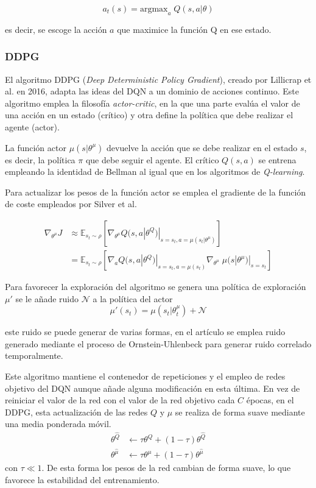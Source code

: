 \begin{equation}		
		a_t(s) = \text{argmax}_a\;Q(s,a|\theta) 
\end{equation}

es decir, se escoge la acción $a$ que maximice la función Q en ese estado.
\subsubsection{DDPG}

El algoritmo DDPG (\textit{Deep Deterministic Policy Gradient}), creado por Lillicrap et al. \cite{lillicrap2015continuous} en 2016, adapta las ideas del DQN a un dominio de acciones continuo. Este algoritmo emplea la filosofía \textit{actor-critic}, en la que una parte evalúa el valor de una acción en un estado (crítico) y  otra define la política que debe realizar el agente (actor).

La función actor $\mu(s|\theta^\mu)$ devuelve la acción que se debe realizar en el estado $s$, es decir, la política $\pi$ que debe seguir el agente. El crítico $Q(s,a)$ se entrena empleando la identidad de Bellman al igual que en los algoritmos de \textit{Q-learning}.

Para actualizar los pesos de la función actor se emplea el gradiente de la función de coste empleados por Silver et al. \cite{silver2014deterministic}

	\begin{align}
		\nabla_{\theta^\mu}J &\approx \mathbb{E}_{s_t \sim \rho}\left[ \nabla_{\theta^\mu} Q(s,a |\theta^Q)|_{s=s_t,a=\mu(s_t|\theta^\mu)}\right]\\
		&=  \mathbb{E}_{s_t \sim \rho}\left[ \nabla_{a} Q(s,a |\theta^Q)|_{s=s_t,a=\mu(s_t)} \nabla_{\theta^\mu}\; \mu(s|\theta^\mu)|_{s=s_t}    \right]\nonumber 
	\end{align}

Para favorecer la exploración del algoritmo se genera una política de exploración $\mu'$ se le añade ruido $\mathcal{N}$ a la política del actor
	\begin{equation}
		 \mu'(s_t)=\mu(s_t|\theta^\mu_t) + \mathcal{N}
	\end{equation}

este ruido se puede generar de varias formas, en el artículo se emplea ruido generado mediante el proceso de Ornstein-Uhlenbeck \cite{uhlenbeck1930theory} para generar ruido correlado temporalmente.

Este algoritmo mantiene el contenedor de repeticiones y el empleo de redes objetivo del DQN aunque añade alguna modificación en esta última. En vez de reiniciar el valor de la red  con el valor de la red objetivo cada $C$ épocas, en el DDPG, esta actualización de las redes $Q$ y $\mu$ se realiza de forma suave mediante una media ponderada móvil.
\begin{align}
\theta ^{\hat Q} &\leftarrow \tau \theta ^ Q + (1 - \tau)\theta^{\hat Q}\\
\theta ^{\hat \mu} &\leftarrow \tau \theta ^ \mu + (1 - \tau)\theta^{\hat \mu}
\end{align}
con $\tau \ll  1$. De esta forma los pesos de la red cambian de forma suave, lo que favorece la estabilidad del entrenamiento. 

